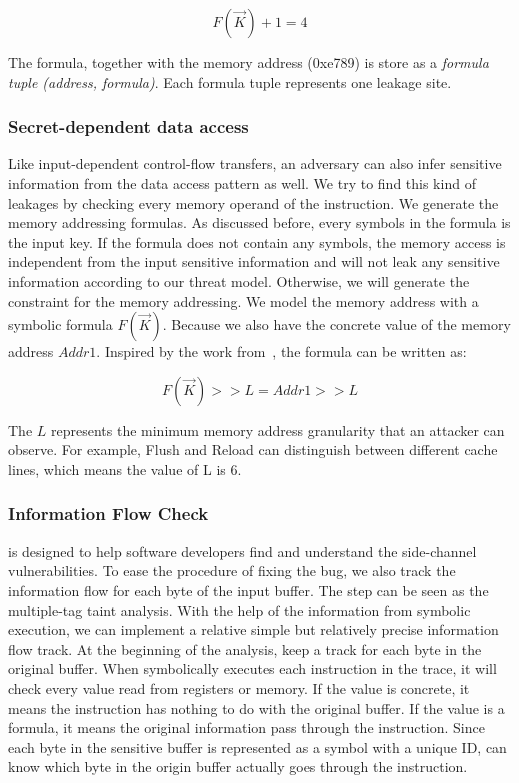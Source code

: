 $$F(\vec{K}) + 1 = 4$$

The formula, together with the memory address (0xe789) is store
as a \textit{formula tuple (address, formula)}. 
Each formula tuple represents one leakage site.

\subsubsection{Secret-dependent data access}
Like input-dependent control-flow transfers, an adversary can also infer 
sensitive information from the data access pattern as well. 
We try to find this kind of leakages by checking 
every memory operand of the instruction. We generate the memory addressing 
formulas. As discussed before, every symbols in the formula is the input key. 
If the formula does not contain any symbols, the memory access is independent 
from the input sensitive information and will not leak any sensitive information 
according to our threat model. Otherwise, we will generate the constraint for
the memory addressing. We model the memory address with a symbolic formula 
$F(\vec{K})$. 
Because we also have the concrete value of the memory address $Addr1$. 
Inspired by the work from~\cite{203878}, the formula can be written as:

$$F(\vec{K}) >> L = Addr1 >> L$$

The $L$ represents the minimum memory address granularity that an attacker 
can observe. For example, Flush and Reload can distinguish between different
cache lines, which means the value of L is 6.

\subsubsection{Information Flow Check}
\tool{} is designed to help software developers find and understand the 
side-channel vulnerabilities. To ease the procedure of fixing the bug,
we also track the information flow for each byte of the input
buffer. 
The step can be seen as the multiple-tag taint analysis.
With the help of the information from symbolic execution, we can implement
a relative simple but relatively precise information flow track.
At the beginning of the analysis, \tool{} keep a track for each byte 
in the original buffer. When \tool{} symbolically executes each
instruction in the trace, it will check every value read from
registers or memory. If the value is concrete, it means the
instruction has nothing to do with the original buffer.
If the value is a formula, it means the original information
pass through the instruction. Since each byte in the sensitive
buffer is represented as a symbol with a unique ID, \tool{} can
know which byte in the origin buffer actually goes through the
instruction.


